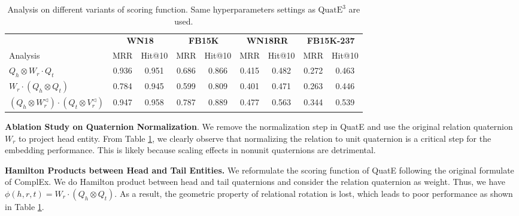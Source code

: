 \documentclass{article}
\begin{document}
\begin{table}[]
\small
\caption{Analysis on different variants of scoring function. Same hyperparameters settings as $\text{QuatE}^3$ are used. }
\centering
\begin{tabular}{lcccccccc}
\toprule
 & \multicolumn{2}{c}{\textbf{WN18}} & \multicolumn{2}{c}{\textbf{FB15K}} & \multicolumn{2}{c}{\textbf{WN18RR}} & \multicolumn{2}{c}{\textbf{FB15K-237}} \\
Analysis & MRR  & Hit@10  & MRR & Hit@10  & MRR  & Hit@10 & MRR    & Hit@10    \\ \midrule
 $Q_h \otimes W_r \cdot Q_t$ &    0.936            &   0.951                &    0.686             &    0.866              &        0.415          &    0.482                 &          0.272         &    0.463                 \\
 $W_r \cdot (Q_h \otimes  Q_t)$    &   0.784     &   0.945   &     0.599        &   0.809       &    0.401      &      0.471              &    0.263    &  0.446         \\
$(Q_h \otimes W_{r}^{\triangleleft}) \cdot (Q_t \otimes V_{r}^{\triangleleft})$  &       0.947         &    0.958               &       0.787           &            0.889       &           0.477       &    0.563                &           0.344        &      0.539               \\ \bottomrule
\end{tabular}
\vspace{-1em}
\label{ablation}
\end{table}

\textbf{Ablation Study on Quaternion Normalization}. We remove the normalization step in QuatE and use the original relation quaternion $W_r$ to project head entity. From Table \ref{ablation}, we clearly observe that normalizing the relation to unit quaternion is a critical step for the embedding performance. This is likely because scaling effects in nonunit quaternions are detrimental.








\textbf{Hamilton Products between Head and Tail Entities.} We reformulate the scoring function of QuatE following the original formulate of ComplEx. We do Hamilton product between head and tail quaternions and consider the relation quaternion as weight. Thus, we have  $ \phi(h, r, t) = W_r \cdot (Q_h \otimes  Q_t) $. As a result, the geometric property of relational rotation is lost, which leads to poor performance  as shown in Table \ref{ablation}.
\end{document}
